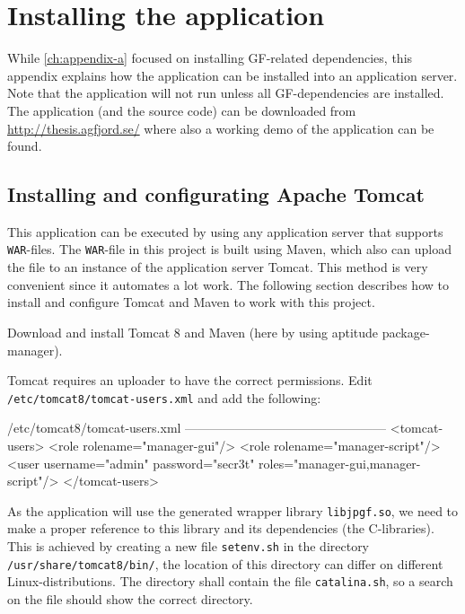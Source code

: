 \chapter{Installing the application}\label{ch:appendix-b}

While \autoref{ch:appendix-a} focused on installing GF-related dependencies, this appendix explains how the application can be installed into an application server. Note that the application will not run unless all GF-dependencies are installed. The application (and the source code) can be downloaded from \url{http://thesis.agfjord.se/} where also a working demo of the application can be found.

\section{Installing and configurating Apache Tomcat}
This application can be executed by using any application server that supports \texttt{WAR}-files. The \texttt{WAR}-file in this project is built using Maven, which also can upload the file to an instance of the application server Tomcat. This method is very convenient since it automates a lot work. The following section describes how to install and configure Tomcat and Maven to work with this project.

Download and install Tomcat 8 and Maven (here by using aptitude package-manager).


Tomcat requires an uploader to have the correct permissions.
\newline
Edit \texttt{/etc/tomcat8/tomcat-users.xml} and add the following:

\begin{terminal}
/etc/tomcat8/tomcat-users.xml
------------------------------------------------
<tomcat-users>
  <role rolename="manager-gui"/>
  <role rolename="manager-script"/>
  <user username="admin" password="secr3t" roles="manager-gui,manager-script"/>
</tomcat-users>
\end{terminal}

As the application will use the generated wrapper library \texttt{libjpgf.so}, we need to make a proper reference to this library and its dependencies (the C-libraries). This is achieved by creating a new file \texttt{setenv.sh} in the directory \texttt{/usr/share/tomcat8/bin/}, the location of this directory can differ on different Linux-distributions. The directory shall contain the file \texttt{catalina.sh}, so a search on the file should show the correct directory.

